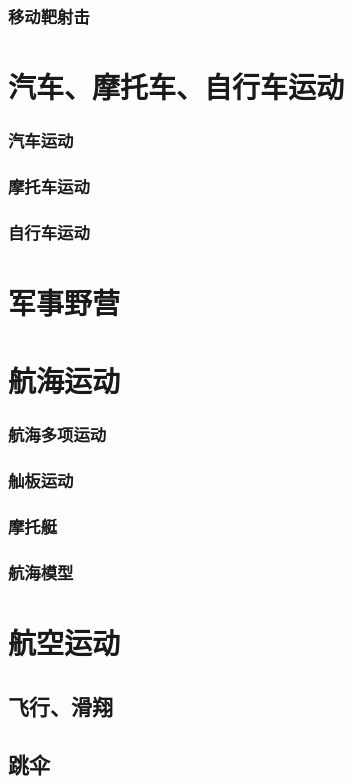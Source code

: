 \documentclass[UTF8]{../../ApplicationUniverse}
\begin{document}
    \subsubsection{移动靶射击}
\section{汽车、摩托车、自行车运动}
    \subsubsection{汽车运动}
    \subsubsection{摩托车运动}
    \subsubsection{自行车运动}
\section{军事野营}
\section{航海运动}
    \subsubsection{航海多项运动}
    \subsubsection{舢板运动}
    \subsubsection{摩托艇}
    \subsubsection{航海模型}
\section{航空运动}
    \subsection{飞行、滑翔}
    \subsection{跳伞}
\end{document}
